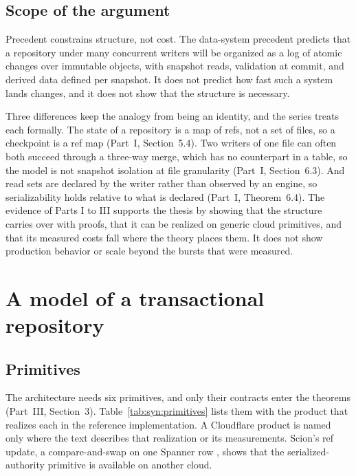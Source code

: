 \documentclass[11pt,letterpaper]{article}
\theoremstyle{definition}
\theoremstyle{remark}
\begin{document}
\subsection{Scope of the argument}

Precedent constrains structure, not cost. The data-system precedent predicts that a repository under many concurrent writers will be organized as a log of atomic changes over immutable objects, with snapshot reads, validation at commit, and derived data defined per snapshot. It does not predict how fast such a system lands changes, and it does not show that the structure is necessary.

Three differences keep the analogy from being an identity, and the series treats each formally. The state of a repository is a map of refs, not a set of files, so a checkpoint is a ref map (Part~I, Section~5.4). Two writers of one file can often both succeed through a three-way merge, which has no counterpart in a table, so the model is not snapshot isolation at file granularity (Part~I, Section~6.3). And read sets are declared by the writer rather than observed by an engine, so serializability holds relative to what is declared (Part~I, Theorem~6.4). The evidence of Parts I to III supports the thesis by showing that the structure carries over with proofs, that it can be realized on generic cloud primitives, and that its measured costs fall where the theory places them. It does not show production behavior or scale beyond the bursts that were measured.

\section{A model of a transactional repository}
\label{sec:syn:model}

\subsection{Primitives}

The architecture needs six primitives, and only their contracts enter the theorems (Part~III, Section~3). Table~\ref{tab:syn:primitives} lists them with the product that realizes each in the reference implementation. A Cloudflare product is named only where the text describes that realization or its measurements. Scion's ref update, a compare-and-swap on one Spanner row \cite{anthropic2026scion,corbett2012spanner}, shows that the serialized-authority primitive is available on another cloud.
\end{document}
